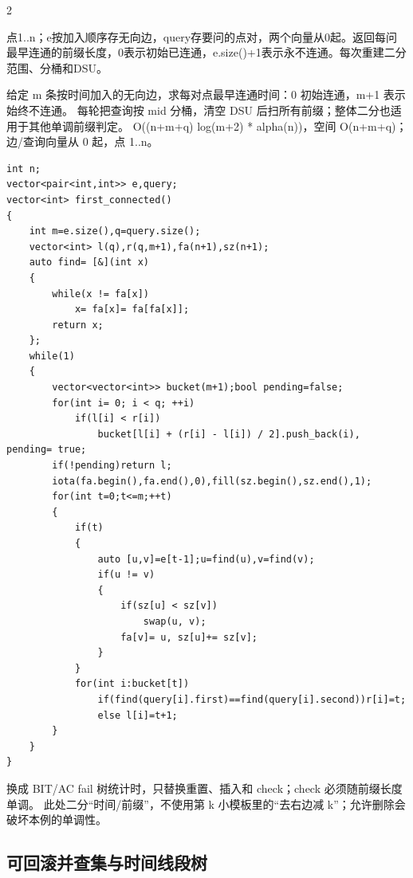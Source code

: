 \documentclass[UTF8,fontset=fandol,a4paper,twoside]{ctexart}
\newcommand{\note}[1]{{\fontsize{10}{12}\selectfont #1\par}}
\begin{document}
\begin{multicols}{2}
\note{点1.\allowbreak{}.\allowbreak{}n；e按加入顺序存无向边，query存要问的点对，两个向量从0起。返回每问最早连通的前缀长度，0表示初始已连通，e.\allowbreak{}size(\allowbreak{})\allowbreak{}+\allowbreak{}1表示永不连通。每次重建二分范围、分桶和DSU。}
\note{给定 m 条按时间加入的无向边，求每对点最早连通时间：0 初始连通，m+\allowbreak{}1 表示始终不连通。 每轮把查询按 mid 分桶，清空 DSU 后扫所有前缀；整体二分也适用于其他单调前缀判定。 O(\allowbreak{}(\allowbreak{}n+\allowbreak{}m+\allowbreak{}q)\allowbreak{} log(\allowbreak{}m+\allowbreak{}2)\allowbreak{} * alpha(\allowbreak{}n)\allowbreak{})\allowbreak{}，空间 O(\allowbreak{}n+\allowbreak{}m+\allowbreak{}q)\allowbreak{}；边/\allowbreak{}查询向量从 0 起，点 1.\allowbreak{}.\allowbreak{}n。}
\begin{lstlisting}
int n;
vector<pair<int,int>> e,query;
vector<int> first_connected()
{
    int m=e.size(),q=query.size();
    vector<int> l(q),r(q,m+1),fa(n+1),sz(n+1);
    auto find= [&](int x)
    {
        while(x != fa[x])
            x= fa[x]= fa[fa[x]];
        return x;
    };
    while(1)
    {
        vector<vector<int>> bucket(m+1);bool pending=false;
        for(int i= 0; i < q; ++i)
            if(l[i] < r[i])
                bucket[l[i] + (r[i] - l[i]) / 2].push_back(i), pending= true;
        if(!pending)return l;
        iota(fa.begin(),fa.end(),0),fill(sz.begin(),sz.end(),1);
        for(int t=0;t<=m;++t)
        {
            if(t)
            {
                auto [u,v]=e[t-1];u=find(u),v=find(v);
                if(u != v)
                {
                    if(sz[u] < sz[v])
                        swap(u, v);
                    fa[v]= u, sz[u]+= sz[v];
                }
            }
            for(int i:bucket[t])
                if(find(query[i].first)==find(query[i].second))r[i]=t;
                else l[i]=t+1;
        }
    }
}
\end{lstlisting}
\note{换成 BIT/\allowbreak{}AC fail 树统计时，只替换重置、插入和 check；check 必须随前缀长度单调。 此处二分“时间/\allowbreak{}前缀”，不使用第 k 小模板里的“去右边减 k”；允许删除会破坏本例的单调性。}
\subsection{可回滚并查集与时间线段树}


\end{multicols}
\end{document}
